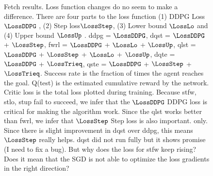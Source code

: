 \begin{figure}
  \caption{
    Fetch results. Loss function changes do no seem to make a difference.
    There are four parts to the loss function (1) DDPG Loss $\LossDDPG$ ,
    (2) Step loss$\LossStep$,  
    (3) Lower bound $\LossLo$ and
    (4) Upper bound $\LossUp$ .
    ddpg = $\LossDDPG$,
    dqst = $\LossDDPG$ + $\LossStep$,
    fwrl = $\LossDDPG$ + $\LossLo$ +
    $\LossUp$,
    qlst = $\LossDDPG$ + $\LossStep$ + $\LossLo$ + $\LossUp$,
    dqte = $\LossDDPG$ + $\LossTrieq$,
    qste = $\LossDDPG$ + $\LossStep$ + $\LossTrieq$.
    Success rate is the fraction of times the agent reaches the goal. Q(test) is
    the estimated cumulative reward by the network. Critic loss is the total
    loss plotted during training.
    Because stfw, stlo, stup fail to succeed, we infer that the $\LossDDPG$ DDPG loss is
    critical for making the algorithm work. Since the qlst works better than
    fwrl, we infer that $\LossStep$ Step loss is also important.
    only.
    Since there is slight improvement in dqst over ddpg, this means
    $\LossStep$ really helps. dqst did not run fully but it shows
    promise (I need to fix a bug).
    But why does the loss for stfw keep rising? Does it mean that the SGD is not
    able to optimize the loss gradients in the right direction?
  }%
  \label{fig:fwrl-stepfwrl-noop-FetchPush}%
\end{figure}%
% 

